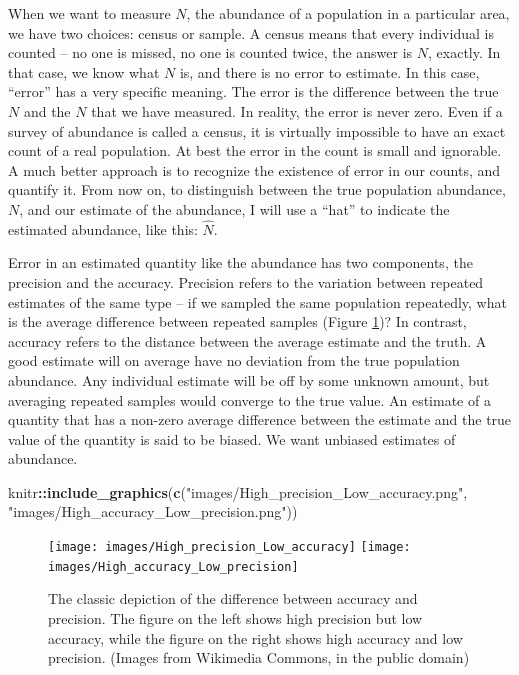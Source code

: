 \documentclass[]{book}
\newenvironment{Shaded}{\begin{snugshade}}{\end{snugshade}}
\newcommand{\KeywordTok}[1]{\textcolor[rgb]{0.13,0.29,0.53}{\textbf{#1}}}
\newcommand{\NormalTok}[1]{#1}
\newcommand{\OperatorTok}[1]{\textcolor[rgb]{0.81,0.36,0.00}{\textbf{#1}}}
\newcommand{\StringTok}[1]{\textcolor[rgb]{0.31,0.60,0.02}{#1}}
\theoremstyle{definition}
\theoremstyle{definition}
\theoremstyle{definition}
\theoremstyle{remark}
\begin{document}
When we want to measure \(N\), the abundance of a population in a
particular area, we have two choices: census or sample. A census means
that every individual is counted -- no one is missed, no one is counted
twice, the answer is \(N\), exactly. In that case, we know what \(N\)
is, and there is no error to estimate. In this case, ``error'' has a
very specific meaning. The error is the difference between the true
\(N\) and the \(N\) that we have measured. In reality, the error is
never zero. Even if a survey of abundance is called a census, it is
virtually impossible to have an exact count of a real population. At
best the error in the count is small and ignorable. A much better
approach is to recognize the existence of error in our counts, and
quantify it. From now on, to distinguish between the true population
abundance, \(N\), and our estimate of the abundance, I will use a
``hat'' to indicate the estimated abundance, like this: \(\hat{N}\).

Error in an estimated quantity like the abundance has two components,
the precision and the accuracy. Precision refers to the variation
between repeated estimates of the same type -- if we sampled the same
population repeatedly, what is the average difference between repeated
samples (Figure \ref{fig:precision})? In contrast, accuracy refers to
the distance between the average estimate and the truth. A good estimate
will on average have no deviation from the true population abundance.
Any individual estimate will be off by some unknown amount, but
averaging repeated samples would converge to the true value. An estimate
of a quantity that has a non-zero average difference between the
estimate and the true value of the quantity is said to be biased. We
want unbiased estimates of abundance.

\begin{Shaded}
\begin{Highlighting}[]
\NormalTok{knitr}\OperatorTok{::}\KeywordTok{include_graphics}\NormalTok{(}\KeywordTok{c}\NormalTok{(}\StringTok{"images/High_precision_Low_accuracy.png"}\NormalTok{, }\StringTok{"images/High_accuracy_Low_precision.png"}\NormalTok{))}
\end{Highlighting}
\end{Shaded}

\begin{figure}
\texttt{[image: images/High\_precision\_Low\_accuracy]} \texttt{[image: images/High\_accuracy\_Low\_precision]} \caption{The classic depiction of the difference between accuracy and precision. The figure on the left shows high precision but low accuracy, while the figure on the right shows high accuracy and low precision. (Images from Wikimedia Commons, in the public domain)}\label{fig:precision}
\end{figure}
\end{document}
